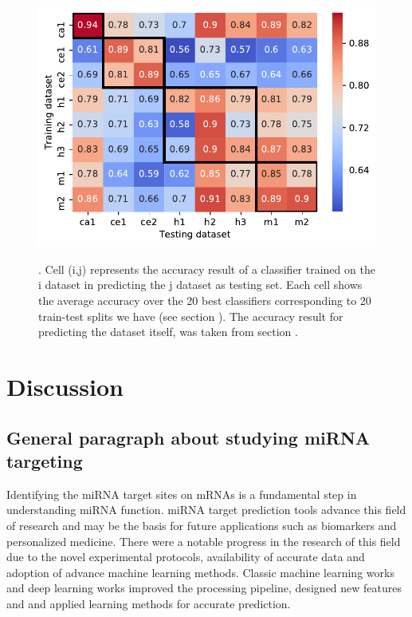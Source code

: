\documentclass{bmcart}
\begin{document}
\begin{figure}[h!]
  \caption{. Cell (i,j) represents the accuracy result of a classifier trained on the i dataset in predicting the j dataset as testing set. Each cell shows the average accuracy over the 20 best classifiers corresponding to 20 train-test splits we have (see section ). The accuracy result for predicting the dataset itself, was taken from section . }
      \includegraphics[width = 1\textwidth]{Results/diff_summary.pdf}
    \label{fig:crossdataset}
      \end{figure}


\section*{Discussion}
\subsection*{General paragraph about studying miRNA targeting}
Identifying the miRNA target sites on mRNAs is a fundamental step in understanding miRNA function. miRNA target prediction tools advance this field of research and may be the basis for future applications such as biomarkers and personalized medicine. There were a notable progress in the research of this field due to the novel experimental protocols, availability of accurate data and adoption of advance machine learning methods. Classic machine learning works  and deep learning works  improved the processing pipeline, designed new features and and applied learning methods for accurate prediction. 
\end{document}
